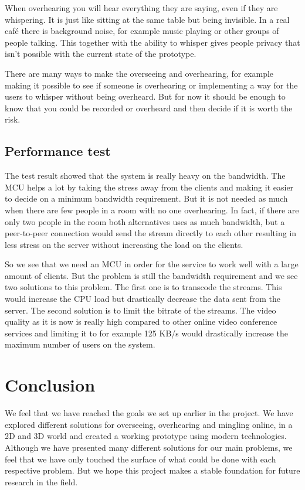 \documentclass[12pt, titlepage]{article}
\begin{document}
When overhearing you will hear everything they are saying, even if they are whispering. It is just like sitting at the same table but being invisible. In a real café there is background noise, for example music playing or other groups of people talking. This together with the ability to whisper gives people privacy that isn't possible with the current state of the prototype.

There are many ways to make the overseeing and overhearing, for example making it possible to see if someone is overhearing or implementing a way for the users to whisper without being overheard. But for now it should be enough to know that you could be recorded or overheard and then decide if it is worth the risk.

\subsection{Performance test}
The test result showed that the system is really heavy on the bandwidth. The MCU helps a lot by taking the stress away from the clients and making it easier to decide on a minimum bandwidth requirement. But it is not needed as much when there are few people in a room with no one overhearing. In fact, if there are only two people in the room both alternatives uses as much bandwidth, but a peer-to-peer connection would send the stream directly to each other resulting in less stress on the server without increasing the load on the clients.

So we see that we need an MCU in order for the service to work well with a large amount of clients. But the problem is still the bandwidth requirement and we see two solutions to this problem. The first one is to transcode the streams. This would increase the CPU load but drastically decrease the data sent from the server. The second solution is to limit the bitrate of the streams. The video quality as it is now is really high compared to other online video conference services and limiting it to for example 125 KB/s would drastically increase the maximum number of users on the system.

\section{Conclusion}
We feel that we have reached the goals we set up earlier in the project. We have explored different solutions for overseeing, overhearing and mingling online, in a 2D and 3D world and created a working prototype using modern technologies. Although we have presented many different solutions for our main problems, we feel that we have only touched the surface of what could be done with each respective problem. But we hope this project makes a stable foundation for future research in the field.
\end{document}
